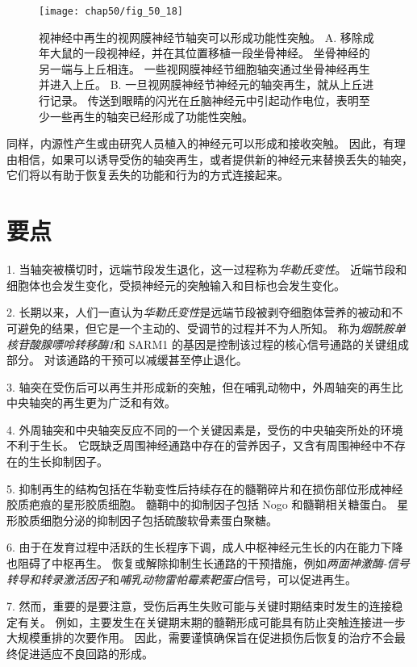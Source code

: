\begin{figure}[htbp]
	\centering
	\texttt{[image: chap50/fig\_50\_18]}
	\caption{视神经中再生的视网膜神经节轴突可以形成功能性突触\cite{keirstead1989electrophysiologic}。
		A. 移除成年大鼠的一段视神经，并在其位置移植一段坐骨神经。
		坐骨神经的另一端与上丘相连。
		一些视网膜神经节细胞轴突通过坐骨神经再生并进入上丘。
		B. 一旦视网膜神经节神经元的轴突再生，就从上丘进行记录。
		传送到眼睛的闪光在丘脑神经元中引起动作电位，表明至少一些再生的轴突已经形成了功能性突触。}
	\label{fig:50_18}
\end{figure}


同样，内源性产生或由研究人员植入的神经元可以形成和接收突触。
因此，有理由相信，如果可以诱导受伤的轴突再生，或者提供新的神经元来替换丢失的轴突，它们将以有助于恢复丢失的功能和行为的方式连接起来。



\section{要点}

1. 当轴突被横切时，远端节段发生退化，这一过程称为\textit{华勒氏变性}。
近端节段和细胞体也会发生变化，受损神经元的突触输入和目标也会发生变化。


2. 长期以来，人们一直认为\textit{华勒氏变性}是远端节段被剥夺细胞体营养的被动和不可避免的结果，但它是一个主动的、受调节的过程并不为人所知。
称为\textit{烟酰胺单核苷酸腺嘌呤转移酶1}和 SARM1 的基因是控制该过程的核心信号通路的关键组成部分。
对该通路的干预可以减缓甚至停止退化。 


3. 轴突在受伤后可以再生并形成新的突触，但在哺乳动物中，外周轴突的再生比中央轴突的再生更为广泛和有效。


4. 外周轴突和中央轴突反应不同的一个关键因素是，受伤的中央轴突所处的环境不利于生长。
它既缺乏周围神经通路中存在的营养因子，又含有周围神经中不存在的生长抑制因子。


5. 抑制再生的结构包括在华勒变性后持续存在的髓鞘碎片和在损伤部位形成神经胶质疤痕的星形胶质细胞。
髓鞘中的抑制因子包括 Nogo 和髓鞘相关糖蛋白。
星形胶质细胞分泌的抑制因子包括硫酸软骨素蛋白聚糖。
 

6. 由于在发育过程中活跃的生长程序下调，成人中枢神经元生长的内在能力下降也阻碍了中枢再生。
恢复或解除抑制生长通路的干预措施，例如\textit{两面神激酶-信号转导和转录激活因子}和\textit{哺乳动物雷帕霉素靶蛋白}信号，可以促进再生。


7. 然而，重要的是要注意，受伤后再生失败可能与关键时期结束时发生的连接稳定有关。
例如，主要发生在关键期末期的髓鞘形成可能具有防止突触连接进一步大规模重排的次要作用。
因此，需要谨慎确保旨在促进损伤后恢复的治疗不会最终促进适应不良回路的形成。 


